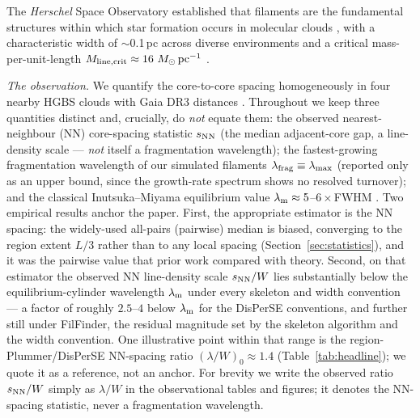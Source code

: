 \documentclass[usenatbib,twoside,twocolumn]{mnras}
\begin{document}
The \textit{Herschel} Space Observatory established that filaments are the fundamental structures within which star formation occurs in molecular clouds \citep{Andre2010}, with a characteristic width of $\sim$0.1\,pc across diverse environments \citep{Arzoumanian2011} and a critical mass-per-unit-length $M_{\rm line,crit}\approx16~M_\odot\,{\rm pc^{-1}}$ \citep{Ostriker1964}.

\emph{The observation.} We quantify the core-to-core spacing homogeneously in four nearby HGBS clouds with Gaia DR3 distances \citep{Zhang2023}. Throughout we keep three quantities distinct and, crucially, do \emph{not} equate them: the observed nearest-neighbour (NN) core-spacing statistic $s_{\rm NN}$ (the median adjacent-core gap, a line-density scale --- \emph{not} itself a fragmentation wavelength); the fastest-growing fragmentation wavelength of our simulated filaments $\lambda_{\rm frag}\equiv\lambda_{\rm max}$ (reported only as an upper bound, since the growth-rate spectrum shows no resolved turnover); and the classical Inutsuka--Miyama equilibrium value $\lambda_{\rm m}\approx5$--$6\times$FWHM \citep{Inutsuka1992,Fischera2012}. Two empirical results anchor the paper. First, the appropriate estimator is the NN spacing: the widely-used all-pairs (pairwise) median is biased, converging to the region extent $L/3$ rather than to any local spacing (Section~\ref{sec:statistics}), and it was the pairwise value that prior work compared with theory. Second, on that estimator the observed NN line-density scale $s_{\rm NN}/W$ lies substantially below the equilibrium-cylinder wavelength $\lambda_{\rm m}$ under every skeleton and width convention --- a factor of roughly $2.5$--$4$ below $\lambda_{\rm m}$ for the DisPerSE conventions, and further still under FilFinder, the residual magnitude set by the skeleton algorithm and the width convention. One illustrative point within that range is the region-Plummer/DisPerSE NN-spacing ratio $(\lambda/W)_0\approx1.4$ (Table~\ref{tab:headline}); we quote it as a reference, not an anchor. For brevity we write the observed ratio $s_{\rm NN}/W$ simply as $\lambda/W$ in the observational tables and figures; it denotes the NN-spacing statistic, never a fragmentation wavelength.
\end{document}
